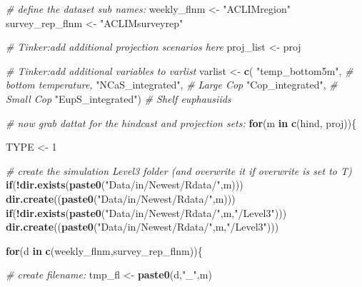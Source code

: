 \documentclass[
]{article}
\newenvironment{Shaded}{\begin{snugshade}}{\end{snugshade}}
\newcommand{\CommentTok}[1]{\textcolor[rgb]{0.56,0.35,0.01}{\textit{#1}}}
\newcommand{\ControlFlowTok}[1]{\textcolor[rgb]{0.13,0.29,0.53}{\textbf{#1}}}
\newcommand{\DecValTok}[1]{\textcolor[rgb]{0.00,0.00,0.81}{#1}}
\newcommand{\KeywordTok}[1]{\textcolor[rgb]{0.13,0.29,0.53}{\textbf{#1}}}
\newcommand{\NormalTok}[1]{#1}
\newcommand{\OperatorTok}[1]{\textcolor[rgb]{0.81,0.36,0.00}{\textbf{#1}}}
\newcommand{\StringTok}[1]{\textcolor[rgb]{0.31,0.60,0.02}{#1}}
\begin{document}
\begin{Shaded}
\begin{Highlighting}[]
    \CommentTok{# define the dataset sub names:   }
\NormalTok{    weekly_flnm     <-}\StringTok{ "ACLIMregion"}
\NormalTok{    survey_rep_flnm <-}\StringTok{ "ACLIMsurveyrep"}
    
    \CommentTok{# Tinker:add additional projection scenarios here}
\NormalTok{    proj_list       <-}\StringTok{ }\NormalTok{proj    }

    
    \CommentTok{# Tinker:add additional variables to varlist}
\NormalTok{    varlist         <-}\StringTok{ }\KeywordTok{c}\NormalTok{(}
                          \StringTok{"temp_bottom5m"}\NormalTok{,    }\CommentTok{# bottom temperature,}
                          \StringTok{"NCaS_integrated"}\NormalTok{,  }\CommentTok{# Large Cop}
                          \StringTok{"Cop_integrated"}\NormalTok{,   }\CommentTok{# Small Cop}
                          \StringTok{"EupS_integrated"}\NormalTok{)  }\CommentTok{# Shelf  euphausiids}
    
              
    \CommentTok{# now grab dattat for the hindcast and projection sets:}
    \ControlFlowTok{for}\NormalTok{(m }\ControlFlowTok{in} \KeywordTok{c}\NormalTok{(hind, proj))\{}
      
\NormalTok{      TYPE <-}\StringTok{ }\DecValTok{1}
     
      \CommentTok{# create the simulation Level3 folder (and overwrite it if overwrite is set to T)}
      \ControlFlowTok{if}\NormalTok{(}\OperatorTok{!}\KeywordTok{dir.exists}\NormalTok{(}\KeywordTok{paste0}\NormalTok{(}\StringTok{"Data/in/Newest/Rdata/"}\NormalTok{,m)))}
        \KeywordTok{dir.create}\NormalTok{((}\KeywordTok{paste0}\NormalTok{(}\StringTok{"Data/in/Newest/Rdata/"}\NormalTok{,m)))}
      \ControlFlowTok{if}\NormalTok{(}\OperatorTok{!}\KeywordTok{dir.exists}\NormalTok{(}\KeywordTok{paste0}\NormalTok{(}\StringTok{"Data/in/Newest/Rdata/"}\NormalTok{,m,}\StringTok{"/Level3"}\NormalTok{)))}
        \KeywordTok{dir.create}\NormalTok{((}\KeywordTok{paste0}\NormalTok{(}\StringTok{"Data/in/Newest/Rdata/"}\NormalTok{,m,}\StringTok{"/Level3"}\NormalTok{)))}
      
      \ControlFlowTok{for}\NormalTok{(d }\ControlFlowTok{in} \KeywordTok{c}\NormalTok{(weekly_flnm,survey_rep_flnm))\{}
          
          \CommentTok{# create filename:}
\NormalTok{          tmp_fl <-}\StringTok{ }\KeywordTok{paste0}\NormalTok{(d,}\StringTok{"_"}\NormalTok{,m)}
          

\end{Highlighting}
\end{Shaded}
\end{document}
